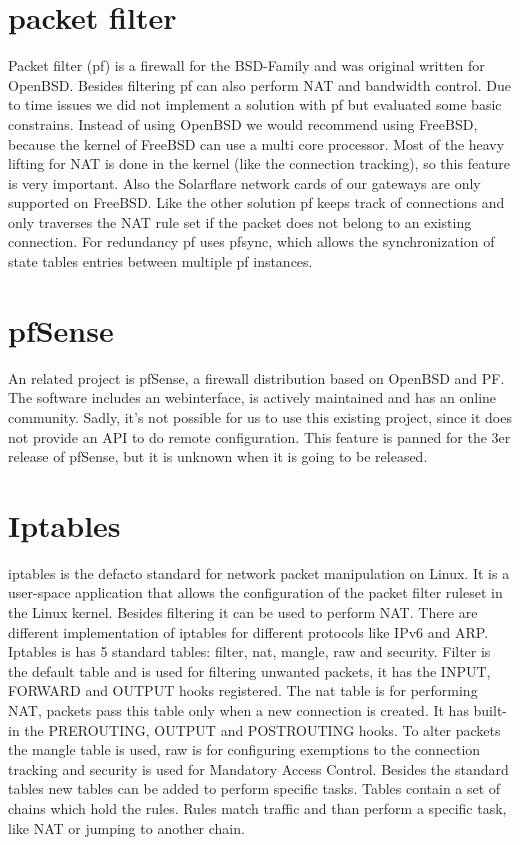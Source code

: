 \documentclass{report}
\begin{document}
\section{packet filter}\label{packet-filter}

Packet filter (pf)\cite{pf}\cite{pfOpenBSD} is a firewall for the BSD-Family and was
original written for OpenBSD. Besides filtering pf can also perform NAT
and bandwidth control. Due to time issues we did not implement a
solution with pf but evaluated some basic constrains. Instead of using
OpenBSD we would recommend using FreeBSD, because the kernel of FreeBSD
can use a multi core processor. Most of the heavy lifting for NAT is
done in the kernel (like the connection tracking), so this feature is
very important. Also the Solarflare network cards of our gateways are
only supported on FreeBSD. Like the other solution pf keeps track of
connections and only traverses the NAT rule set if the packet does not
belong to an existing connection. For redundancy pf uses pfsync\cite{pfsync},
which allows the synchronization of state tables entries between
multiple pf instances.

\section{pfSense}\label{pfsense}

An related project is pfSense\cite{pfsense}, a firewall distribution based on
OpenBSD and PF. The software includes an webinterface, is actively
maintained and has an online community. Sadly, it's not possible for us
to use this existing project, since it does not provide an API to do
remote configuration. This feature is panned for the 3er release of
pfSense, but it is unknown when it is going to be released.


\section{Iptables}\label{iptables}

iptables\cite{iptables} is the defacto standard for network packet manipulation on
Linux. It is a user-space application that allows the configuration of
the packet filter ruleset in the Linux kernel. Besides filtering it can
be used to perform NAT. There are different implementation of iptables
for different protocols like IPv6 and ARP. Iptables is has 5 standard
tables: filter, nat, mangle, raw and security. Filter is the default
table and is used for filtering unwanted packets, it has the INPUT,
FORWARD and OUTPUT hooks registered. The nat table is for performing
NAT, packets pass this table only when a new connection is created. It
has built-in the PREROUTING, OUTPUT and POSTROUTING hooks. To alter
packets the mangle table is used, raw is for configuring exemptions to
the connection tracking and security is used for Mandatory Access
Control. Besides the standard tables new tables can be added to perform
specific tasks. Tables contain a set of chains which hold the rules.
Rules match traffic and than perform a specific task, like NAT or
jumping to another chain.
\end{document}
